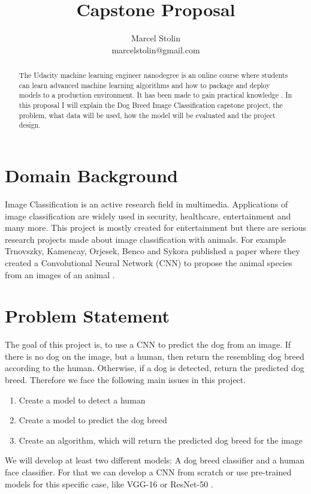 \documentclass{article}
\title{Capstone Proposal}
\date{}
\author{Marcel Stolin \\ marcelstolin@gmail.com}
\begin{document}
\maketitle

\begin{abstract}
The Udacity machine learning engineer nanodegree is an online course where students can learn advanced machine learning algorithms and how to package and deploy models to a production environment. It has been made to gain practical knowledge \cite{mal_eng}. \newline
In this proposal I will explain the Dog Breed Image Classification capstone project, the problem, what data will be used, how the model will be evaluated and the project design.
\end{abstract}


\section{Domain Background} \label{s_domain_back}
Image Classification is an active research field in multimedia. Applications of image classification are widely used in security, healthcare, entertainment and many more.\newline
This project is mostly created for entertainment but there are serious research projects made about image classification with animals. For example Trnovszky, Kamencay, Orjesek, Benco and Sykora published a paper where they created a Convolutional Neural Network (CNN) to propose the animal species from an images of an animal \cite{animal_rec}.
 
 
\section{Problem Statement} \label{s_prob_stat}
The goal of this project is, to use a CNN to predict the dog from an image. If there is no dog on the image, but a human, then return the resembling dog breed according to the human. Otherwise, if a dog is detected, return the predicted dog breed. Therefore we face the following main issues in this project.
\begin{enumerate}
	\item Create a model to detect a human
	\item Create a model to predict the dog breed
	\item Create an algorithm, which will return the predicted dog breed for the image
\end{enumerate}
We will develop at least two different models: A dog breed classifier and a human face classifier. For that we can develop a CNN from scratch or use pre-trained models for this specific case, like VGG-16 \cite{vgg} or ResNet-50 \cite{resnet}.
 
\end{document}

